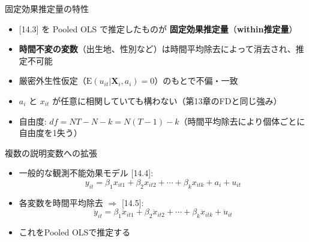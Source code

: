 \documentclass[
  ignorenonframetext,
]{beamer}
\providecommand{\tightlist}{%
  \setlength{\itemsep}{0pt}\setlength{\parskip}{0pt}}
\begin{document}
\begin{frame}{固定効果推定量の特性}
\label{ux56faux5b9aux52b9ux679cux63a8ux5b9aux91cfux306eux7279ux6027}
\begin{itemize}
\tightlist
\item
  {[}14.3{]} を Pooled OLS で推定したものが
  \textbf{固定効果推定量}（\textbf{within推定量}）
\item
  \textbf{時間不変の変数}（出生地、性別など）は時間平均除去によって消去され、推定不可能
\item
  厳密外生性仮定（\(\text{E}(u_{it}|\mathbf{X}_i, a_i) = 0\)）のもとで不偏・一致
\item
  \(a_i\) と \(x_{it}\)
  が任意に相関していても構わない（第13章のFDと同じ強み）
\item
  自由度:
  \(df = NT - N - k = N(T-1) - k\)（時間平均除去により個体ごとに自由度を1失う）
\end{itemize}
\end{frame}

\begin{frame}{複数の説明変数への拡張}
\label{ux8907ux6570ux306eux8aacux660eux5909ux6570ux3078ux306eux62e1ux5f35}
\begin{itemize}
\tightlist
\item
  一般的な観測不能効果モデル {[}14.4{]}:
  \[y_{it} = \beta_1 x_{it1} + \beta_2 x_{it2} + \cdots + \beta_k x_{itk} + a_i + u_{it}\]
\item
  各変数を時間平均除去 \(\Rightarrow\) {[}14.5{]}:
  \[\ddot{y}_{it} = \beta_1 \ddot{x}_{it1} + \beta_2 \ddot{x}_{it2} + \cdots + \beta_k \ddot{x}_{itk} + \ddot{u}_{it}\]
\item
  これをPooled OLSで推定する
\end{itemize}
\end{frame}
\end{document}
